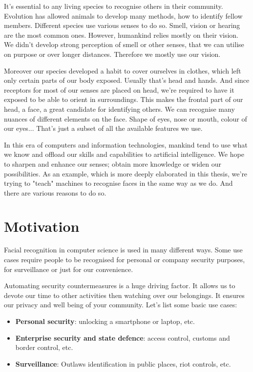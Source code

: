 It's essential to any living species to recognise others in their community. Evolution has allowed animals to develop many methods, how to identify fellow members. Different species use various senses to do so. Smell, vision or hearing are the most common ones. However, humankind relies mostly on their vision. We didn't develop strong perception of smell or other senses, that we can utilise on purpose or over longer distances. Therefore we mostly use our vision.

Moreover our species developed a habit to cover ourselves in clothes, which left only certain parts of our body exposed. Usually that's head and hands. And since receptors for most of our senses are placed on head, we're required to have it exposed to be able to orient in surroundings. This makes the frontal part of our head, a face, a great candidate for identifying others. We can recognise many nuances of different elements on the face. Shape of eyes, nose or mouth, colour of our eyes... That's just a subset of all the available features we use.

In this era of computers and information technologies, mankind tend to use what we know and offload our skills and capabilities to artificial intelligence. We hope to sharpen and enhance our senses; obtain more knowledge or widen our possibilities. As an example, which is more deeply elaborated in this thesis, we're trying to "teach" machines to recognise faces in the same way as we do. And there are various reasons to do so.

\section{Motivation}
Facial recognition in computer science is used in many different ways. Some use cases require people to be recognised for personal or company security purposes, for surveillance or just for our convenience.

Automating security countermeasures is a huge driving factor. It allows us to devote our time to other activities then watching over our belongings. It ensures our privacy and well being of your community. Let's list some basic use cases:

\begin{itemize}
    \item \textbf{Personal security}: unlocking a smartphone or laptop, etc.
    \item \textbf{Enterprise security and state defence}: access control, customs and border control, etc.
    \item \textbf{Surveillance}: Outlaws identification in public places, riot controls, etc.
\end{itemize}

